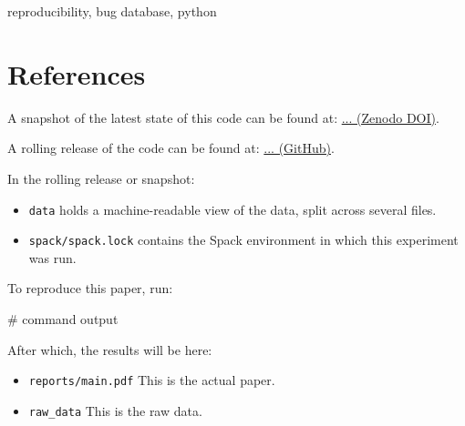 \documentclass[conference]{IEEEtran}
\begin{document}
\begin{IEEEkeywords}
reproducibility, bug database, python
\end{IEEEkeywords}




\section*{References}

\printbibliography


A snapshot of the latest state of this code can be found at: \url{... (Zenodo DOI)}.

A rolling release of the code can be found at: \url{... (GitHub)}.

In the rolling release or snapshot:
\begin{itemize}
\item \texttt{data} holds a machine-readable view of the data, split across several files.
\item \texttt{spack/spack.lock} contains the Spack environment in which this experiment was run.
\end{itemize}

To reproduce this paper, run:

\begin{verbatim*}
# command
output
\end{verbatim*}

After which, the results will be here:

\begin{itemize}
\item \texttt{reports/main.pdf} This is the actual paper.
\item \texttt{raw\_data} This is the raw data.
\end{itemize}
\end{document}
